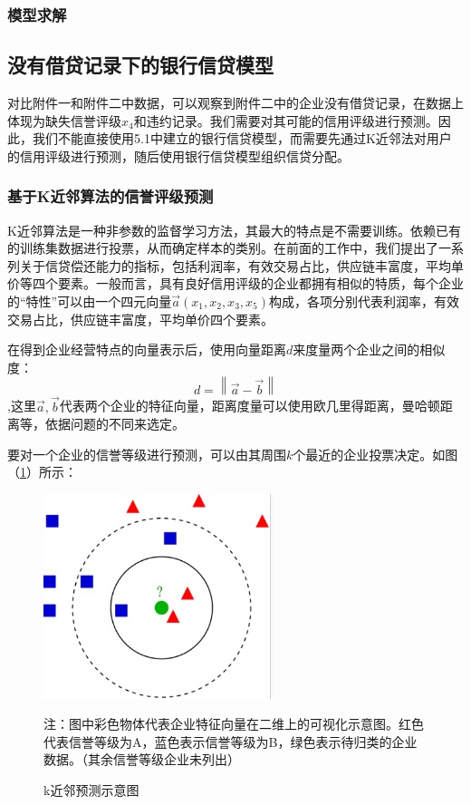 \documentclass{my_paper}
\begin{document}
\subsubsection{模型求解}
\subsection{没有借贷记录下的银行信贷模型}
对比附件一和附件二中数据，可以观察到附件二中的企业没有借贷记录，在数据上体现为缺失信誉评级$x_4$和违约记录。我们需要对其可能的信用评级进行预测。因此，我们不能直接使用5.1中建立的银行信贷模型，而需要先通过K近邻法\cite{6}对用户的信用评级进行预测，随后使用银行信贷模型组织信贷分配。

\subsubsection{基于K近邻算法的信誉评级预测}

K近邻算法是一种非参数的监督学习方法，其最大的特点是不需要训练。依赖已有的训练集数据进行投票，从而确定样本的类别。在前面的工作中，我们提出了一系列关于信贷偿还能力的指标，包括利润率，有效交易占比，供应链丰富度，平均单价等四个要素。一般而言，具有良好信用评级的企业都拥有相似的特质，每个企业的“特性”可以由一个四元向量$\vec{a}(x_1,x_2,x_3,x_5)$构成，各项分别代表利润率，有效交易占比，供应链丰富度，平均单价四个要素。

在得到企业经营特点的向量表示后，使用向量距离$d$来度量两个企业之间的相似度：
\begin{equation}
d = \left\lVert \vec{a}-\vec{b}\right\rVert 
\label{}
\end{equation}
,这里$\vec{a},\vec{b}$代表两个企业的特征向量，距离度量可以使用欧几里得距离，曼哈顿距离等，依据问题的不同来选定。

要对一个企业的信誉等级进行预测，可以由其周围$k$个最近的企业投票决定。如图（\ref{knn}）所示：
\begin {figure}[h]
\centering %
\includegraphics[width=0.6\textwidth]{521.png}

注：图中彩色物体代表企业特征向量在二维上的可视化示意图。红色代表信誉等级为A，蓝色表示信誉等级为B，绿色表示待归类的企业数据。（其余信誉等级企业未列出）
\caption{k近邻预测示意图} %
\label{knn}
\end {figure}
\end{document}
